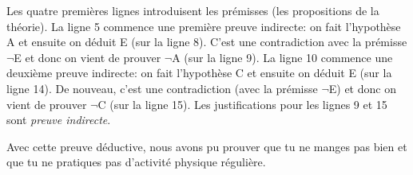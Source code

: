 Les quatre premières lignes introduisent les prémisses (les propositions de la théorie).
La ligne 5 commence une première preuve indirecte: on fait l'hypothèse A
et ensuite on déduit E (sur la ligne 8).  C'est une contradiction avec la prémisse $\lnot$E
et donc on vient de prouver $\lnot$A (sur la ligne 9).
La ligne 10 commence une deuxième preuve indirecte: on fait l'hypothèse C
et ensuite on déduit E (sur la ligne 14).  De nouveau, c'est une contradiction (avec la prémisse $\lnot$E)
et donc on vient de prouver $\lnot$C (sur la ligne 15).
Les justifications pour les lignes 9 et 15 sont {\em preuve indirecte}.

Avec cette preuve déductive,
nous avons pu prouver que tu ne manges pas bien et que tu ne pratiques pas d'activité physique régulière. 
% 


